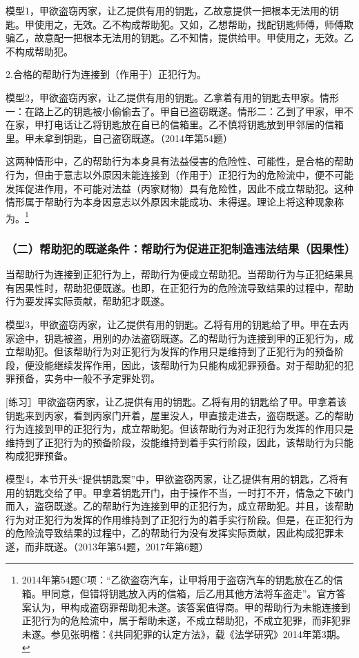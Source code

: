 模型1，甲欲盗窃丙家，让乙提供有用的钥匙，乙故意提供一把根本无法用的钥匙。甲使用之，无效。乙不构成帮助犯。又如，乙想帮助，找配钥匙师傅，师傅欺骗乙，故意配一把根本无法用的钥匙。乙不知情，提供给甲。甲使用之，无效。乙不构成帮助犯。

2.合格的帮助行为连接到（作用于）正犯行为。

模型2，甲欲盗窃丙家，让乙提供有用的钥匙。乙拿着有用的钥匙去甲家。情形一：在路上乙的钥匙被小偷偷去了。甲自已盗窃既遂。情形二：乙到了甲家，甲不在家，甲打电话让乙将钥匙放在自已的信箱里。乙不慎将钥匙放到甲邻居的信箱里。甲未拿到钥匙，自己盗窃既遂。（2014年第54题）

这两种情形中，乙的帮助行为本身具有法益侵害的危险性、可能性，是合格的帮助行为，但由于意志以外原因未能连接到（作用于）正犯行为的危险流中，便不可能发挥促进作用，不可能对法益（丙家财物）具有危险性，因此不成立帮助犯。这种情形属于帮助行为本身因意志以外原因未能成功、未得逞。理论上将这种现象称为。\footnote{2014年第54题C项：“乙欲盗窃汽车，让甲将用于盗窃汽车的钥匙放在乙的信箱。甲同意，但错将钥匙放入丙的信箱，后乙用其他方法将车盗走”。官方答案认为，甲构成盗窃罪帮助犯未遂。该答案值得商。甲的帮助行为未能连接到正犯行为的危险流中，属于帮助未遂，不成立帮助犯，不成立犯罪，而非犯罪未遂。参见张明楷：《共同犯罪的认定方法》，载《法学研究》2014年第3期。}

\subsubsection*{（二）帮助犯的既遂条件：帮助行为促进正犯制造违法结果（因果性）}

当帮助行为连接到正犯行为上，帮助行为便成立帮助犯。当帮助行为与正犯结果具有因果性时，帮助犯便既遂。也即，在正犯行为的危险流导致结果的过程中，帮助行为要发挥实际贡献，帮助犯才既遂。

模型3，甲欲盗窃丙家，让乙提供有用的钥匙。乙将有用的钥匙给了甲。甲在去丙家途中，钥匙被盗，用别的办法盗窃既遂。乙的帮助行为连接到甲的正犯行为，成立帮助犯。但该帮助行为对正犯行为发挥的作用只是维持到了正犯行为的预备阶段，便没能继续发挥作用，因此，该帮助行为只能构成犯罪预备。对于帮助犯的犯罪预备，实务中一般不予定罪处罚。

[练习］甲欲盗窃丙家，让乙提供有用的钥匙。乙将有用的钥匙给了甲。甲拿着该钥匙来到丙家，看到丙家门开着，屋里没人，甲直接走进去，盗窃既遂。乙的帮助行为连接到甲的正犯行为，成立帮助犯。但该帮助行为对正犯行为发挥的作用只是维持到了正犯行为的预备阶段，没能维持到着手实行阶段，因此，该帮助行为只能构成犯罪预备。

模型4，本节开头“提供钥匙案”中，甲欲盗窃丙家，让乙提供有用的钥匙，乙将有用的钥匙交给了甲。甲拿着钥匙开门，由于操作不当，一时打不开，情急之下破门而入，盗窃既遂。乙的帮助行为连接到甲的正犯行为，成立帮助犯。并且，该帮助行为对正犯行为发挥的作用维持到了正犯行为的着手实行阶段。但是，在正犯行为的危险流导致结果的过程中，乙的帮助行为没有发挥实际贡献，因此构成犯罪未遂，而非既遂。（2013年第54题，2017年第6题）

